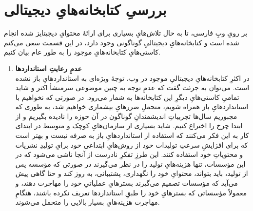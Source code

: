 \documentclass[]{article}
\begin{document}
\section{بررسیِ کتابخانه‌هایِ دیجیتالی}
بر رویِ وبِ فارسی، تا به حال تلاش‌هایِ بسیاری برای ارائهٔ محتوایِ دیجیتایز شده انجام شده است و کتابخانه‌هایِ دیجیتالیِ گوناگونی وجود دارد، در این قسمت سعی می‌کنم کاستی‌هایِ کتابخانه‌هایِ موجود را به طور عام بیان کنیم.
\begin{enumerate}
	\item \textbf{عدمِ رعایتِ استانداردها}\\
در اکثرِ کتابخانه‌هایِ دیجیتالیِ موجود در وب، توجهٔ ویژه‌ای به استانداردهایِ باز نشده است. می‌توان به جرئت گفت که عدمِ توجه به چنین موضوعی سرمنشأ اکثر و شاید تمامیِ کاستی‌هایِ دیگرِ این کتابخانه‌ها به شمار می‌رود. در صورتی که نخواهیم با استانداردهایِ باز همراه شویم، متحملِ ضررهایِ بیشماری خواهیم شد، به طوری که مجبوریم سال‌ها تجربیاتِ اندیشمندانِ گوناگون در آن حوزه را نادیده بگیریم و از ابتدا چرخ را اختراع کنیم. شاید بسیاری از سازمان‌های‌ِ کوچک و متوسط
در ابتدای کار به این فکر می‌کنند که استفاده از استانداردهایِ باز به صرفه نیست و بهتر است که برای افزایشِ سرعتِ تولیدات خود از روش‌هایِ ابتداعی خود برایِ تولیدِ نشریات و محتویاتِ خود استفاده کنند. این طرزِ تفکرِ نادرست از آنجا ناشی می‌شود که در این مؤسسات، تنها هزینه‌هایِ تولید را در نظر می‌گیرند در صورتی که مؤسسه پس از تولید، باید بتواند، محتوایِ خود را نگهداری، پشتیبانی، به روز کند و حتا گاهی پیش می‌آید که مؤسسات تصمیم می‌گیرند بسترهایِ عملیاتیِ خود را مهاجرت دهند، و معمولاً مؤسساتی که بسترهایِ خود را طبقِ استانداردها تعریف نکرده باشند، هنگامِ مهاجرت هزینه‌هایِ بسیار بالایی را متحمل می‌شوند. 


\end{enumerate}
\end{document}
